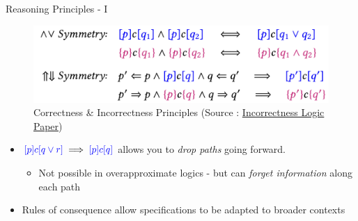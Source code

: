 \documentclass[
  10pt,
  ignorenonframetext,
]{beamer}
\providecommand{\tightlist}{%
  \setlength{\itemsep}{0pt}\setlength{\parskip}{0pt}}
\newcommand{\blue}[1]{\textcolor{blue}{#1}}
\begin{document}
\begin{frame}{Reasoning Principles - I}
\label{reasoning-principles---i}
\begin{figure}
\centering
\includegraphics[width=\textwidth,height=0.4\textheight]{images/principles-1.png}
\caption{Correctness \& Incorrectness Principles (Source :
\href{https://dl.acm.org/doi/10.1145/3371078}{Incorrectness Logic
Paper})}
\end{figure}

\begin{itemize}
\tightlist
\item
  \(\blue{[p]c[q \lor r]} \implies \blue{[p]c[q]}\) allows you to
  \emph{drop paths} going forward.

  \begin{itemize}
  \tightlist
  \item
    Not possible in overapproximate logics - but can \emph{forget
    information} along each path
  \end{itemize}
\item
  Rules of consequence allow specifications to be adapted to broader
  contexts
\end{itemize}
\end{frame}
\end{document}
